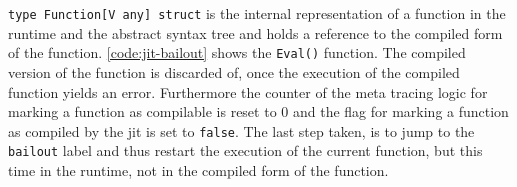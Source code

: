 \texttt{type Function[V any] struct} is the internal representation of
a function in the runtime and the abstract syntax tree and holds a reference to
the compiled form of the function. \autoref{code:jit-bailout} shows the
\texttt{Eval()} function. The compiled version of the function is discarded of,
once the execution of the compiled function yields an error. Furthermore the
counter of the meta tracing logic for marking a function as compilable is reset
to $0$ and the flag for marking a function as compiled by the jit is set to
\texttt{false}. The last step taken, is to jump to the \texttt{bailout} label
and thus restart the execution of the current function, but this time in the
runtime, not in the compiled form of the function.
